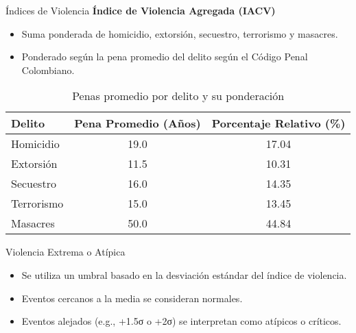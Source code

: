 

\begin{frame}[label=iacv]{Índices de Violencia}
    \textbf{Índice de Violencia Agregada (IACV)}
    \begin{itemize}
        \item Suma ponderada de homicidio, extorsión, secuestro, terrorismo y masacres.
        \item Ponderado según la pena promedio del delito según el Código Penal Colombiano.
    \end{itemize}

    \begin{table}[]
        \centering
        \begin{tabular}{@{}lcc@{}}
        \toprule
        Delito & Pena Promedio (Años) & Porcentaje Relativo (\%) \\ \midrule
        Homicidio & 19.0 & 17.04 \\
        Extorsión & 11.5 & 10.31 \\
        Secuestro & 16.0 & 14.35 \\
        Terrorismo & 15.0 & 13.45 \\
        Masacres & 50.0 & 44.84 \\ \bottomrule
        \end{tabular}
        \caption{Penas promedio por delito y su ponderación}
    \end{table}
\end{frame}

\begin{frame}[label=violencia_atipica]{Violencia Extrema o Atípica}
    \begin{itemize}
        \item Se utiliza un umbral basado en la desviación estándar del índice de violencia.
        \item Eventos cercanos a la media se consideran normales.
        \item Eventos alejados (e.g., +1.5σ o +2σ) se interpretan como atípicos o críticos.
    \end{itemize}
\end{frame}
